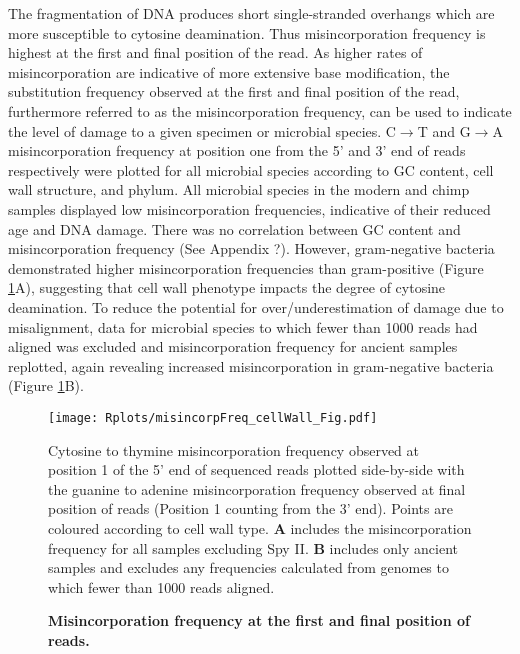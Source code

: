 \documentclass[12pt, a4paper]{article}
\begin{document}
The fragmentation of DNA produces short single-stranded overhangs which are more susceptible to cytosine deamination.
Thus misincorporation frequency is highest at the first and final position of the read.
As higher rates of misincorporation are indicative of more extensive base modification, the substitution frequency observed at the first and final position of the read, furthermore referred to as the misincorporation frequency, can be used to indicate the level of damage to a given specimen or microbial species.
C$\to$T and G$\to$A misincorporation frequency at position one from the 5' and 3' end of reads respectively were plotted for all microbial species according to GC content, cell wall structure, and phylum.
All microbial species in the modern and chimp samples displayed low misincorporation frequencies, indicative of their reduced age and DNA damage. 
There was no correlation between GC content and misincorporation frequency (See Appendix ?). However, gram-negative bacteria demonstrated higher misincorporation frequencies than gram-positive (Figure \ref{fig:misincoprCellWallFig}A), suggesting that cell wall phenotype impacts the degree of cytosine deamination. 
To reduce the potential for over/underestimation of damage due to misalignment, data for microbial species to which fewer than 1000 reads had aligned was excluded and misincorporation frequency for ancient samples replotted, again revealing increased misincorporation in gram-negative bacteria (Figure \ref{fig:misincoprCellWallFig}B).

\begin{figure}[ht!]
	\setlength{\abovecaptionskip}{6pt}
	\begin{center}
	\texttt{[image: Rplots/misincorpFreq\_cellWall\_Fig.pdf]}
	\end{center}
	\caption[Misincorporation frequency at the first and final position of reads]{\textbf{Misincorporation frequency at the first and final position of reads.}} \small{Cytosine to thymine misincorporation frequency observed at position 1 of the 5' end of sequenced reads plotted side-by-side with the guanine to adenine misincorporation frequency observed at final position of reads (Position 1 counting from the 3' end). Points are coloured according to cell wall type. \textbf{A} includes the misincorporation frequency for all samples excluding Spy II. \textbf{B} includes only ancient samples and excludes any frequencies calculated from genomes to which fewer than 1000 reads aligned.}\label{fig:misincoprCellWallFig}
\end{figure}
 
\end{document}
